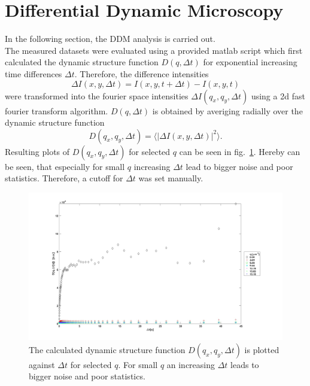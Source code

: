 \section{Differential Dynamic Microscopy}\label{sec:DDMDis}
In the following section, the DDM analysis is carried out.\\
The measured datasets were evaluated using a provided matlab script which first calculated the dynamic structure function $D(q,\Delta t)$ for exponential increasing time differences $\Delta t$. Therefore, the difference intensities 
\begin{equation}
    \Delta I(x,y,\Delta t) = I(x,y,t+\Delta t) - I(x,y,t)
\end{equation}
were transformed into the fourier space intensities $\Delta I(q_x,q_y,\Delta t)$ using a 2d fast fourier transform algorithm. $D(q,\Delta t)$ is obtained by averiging radially over the dynamic structure function 
\begin{equation}
    D(q_x,q_y,\Delta t) = \langle |\Delta I(x,y,\Delta t)|^2 \rangle.
\end{equation}
Resulting plots of $D(q_x,q_y,\Delta t)$ for selected $q$ can be seen in fig.~\ref{fig:DvsDeltat}. Hereby can be seen, that especially for small $q$ increasing $\Delta t$ lead to bigger noise and poor statistics. Therefore, a cutoff for $\Delta t$ was set manually. \par 

\begin{figure}[ht]
    \centering
    \includegraphics[width = \textwidth]{Bilder/Auswertung/DDM/d vs detat.jpg}
    \caption{The calculated dynamic structure function $D(q_x,q_y,\Delta t)$ is plotted against $\Delta t$ for selected $q$. For small $q$ an increasing $\Delta t$ leads to bigger noise and poor statistics.}
    \label{fig:DvsDeltat}
\end{figure}

